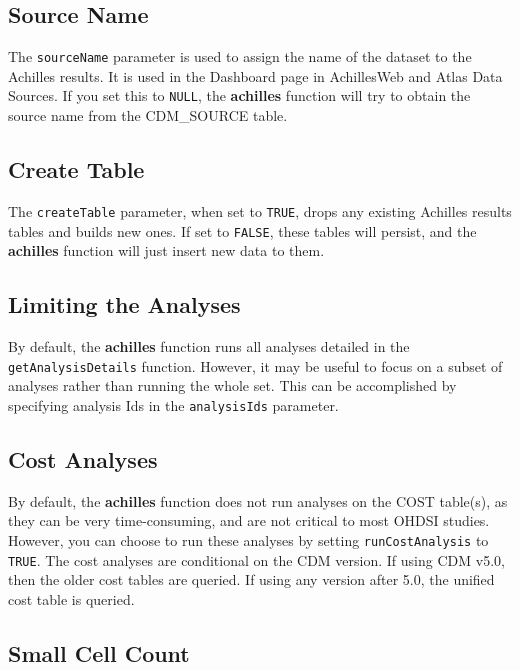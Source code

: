 \documentclass[]{article}
\begin{document}
\subsection{Source Name}\label{source-name}

The \texttt{sourceName} parameter is used to assign the name of the
dataset to the Achilles results. It is used in the Dashboard page in
AchillesWeb and Atlas Data Sources. If you set this to \texttt{NULL},
the \textbf{achilles} function will try to obtain the source name from
the CDM\_SOURCE table.

\subsection{Create Table}\label{create-table}

The \texttt{createTable} parameter, when set to \texttt{TRUE}, drops any
existing Achilles results tables and builds new ones. If set to
\texttt{FALSE}, these tables will persist, and the \textbf{achilles}
function will just insert new data to them.

\subsection{Limiting the Analyses}\label{limiting-the-analyses}

By default, the \textbf{achilles} function runs all analyses detailed in
the \texttt{getAnalysisDetails} function. However, it may be useful to
focus on a subset of analyses rather than running the whole set. This
can be accomplished by specifying analysis Ids in the
\texttt{analysisIds} parameter.

\subsection{Cost Analyses}\label{cost-analyses}

By default, the \textbf{achilles} function does not run analyses on the
COST table(s), as they can be very time-consuming, and are not critical
to most OHDSI studies. However, you can choose to run these analyses by
setting \texttt{runCostAnalysis} to \texttt{TRUE}. The cost analyses are
conditional on the CDM version. If using CDM v5.0, then the older cost
tables are queried. If using any version after 5.0, the unified cost
table is queried.

\subsection{Small Cell Count}\label{small-cell-count}
\end{document}
